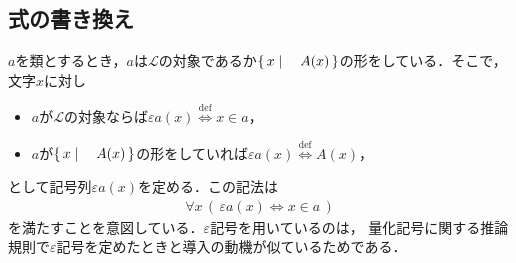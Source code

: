 \subsection{式の書き換え}
	
	$a$を類とするとき，$a$は$\mathcal{L}$の対象であるか$\left\{\, x \mid \quad A(x)\, \right\}$の形をしている．そこで，文字$x$に対し
	\begin{itemize}
		\item $a$が$\mathcal{L}$の対象ならば$\varepsilon a(x) \overset{\mathrm{def}}{\Longleftrightarrow} x \in a$，
		\item $a$が$\left\{\, x \mid \quad A(x)\, \right\}$の形をしていれば$\varepsilon a(x) \overset{\mathrm{def}}{\Longleftrightarrow} A(x)$，
	\end{itemize}
	として記号列$\varepsilon a(x)$を定める．この記法は
	\begin{align}
		\forall x\, (\, \varepsilon a(x) \Longleftrightarrow x \in a\, )
		\label{eq:a_meaning_of_epsilon_notation}
	\end{align}
	を満たすことを意図している．$\varepsilon$記号を用いているのは，
	量化記号に関する推論規則で$\varepsilon$記号を定めたときと導入の動機が似ているためである．
	
